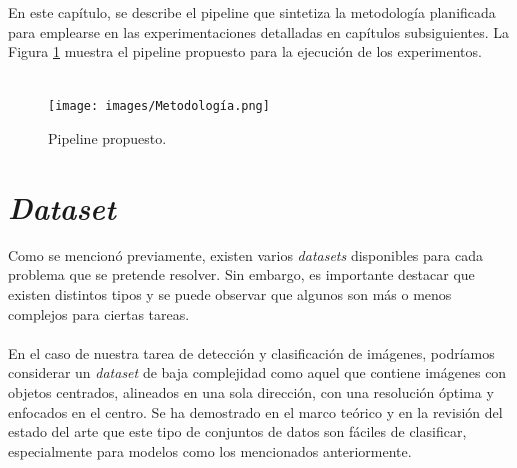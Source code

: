 En este capítulo, se describe el pipeline que sintetiza la metodología 
planificada para emplearse en las experimentaciones detalladas en capítulos 
subsiguientes. La Figura \ref{pipeline} muestra el pipeline propuesto 
para la ejecución de los experimentos.  \\\\

\begin{figure}[h!]
\texttt{[image: images/Metodología.png]}
\centering
\caption{Pipeline propuesto.  }
\label{pipeline}
\end{figure}

\section{\textit{Dataset}}

Como se mencionó previamente, existen varios \textit{datasets} 
disponibles para cada problema que se pretende resolver. Sin embargo, 
es importante destacar que existen distintos tipos y se puede observar 
que algunos son más o menos complejos para ciertas tareas. 
\\\\
En el caso de nuestra tarea de detección y clasificación de imágenes, 
podríamos considerar un \textit{dataset} de baja complejidad como aquel 
que contiene imágenes con objetos centrados, alineados en una sola 
dirección, con una resolución óptima y enfocados en el centro. Se ha 
demostrado en el marco teórico y en la revisión del estado del arte que 
este tipo de conjuntos de datos son fáciles de clasificar, 
especialmente para modelos como los mencionados anteriormente.
\\\\

